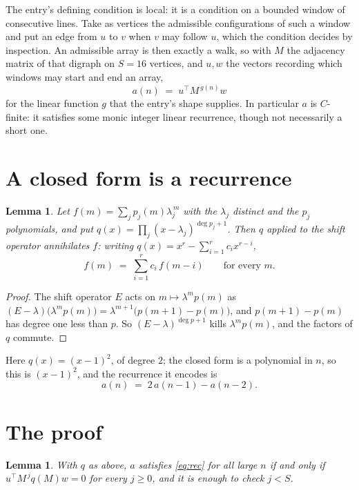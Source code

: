 \documentclass[11pt,a4paper]{article}
\theoremstyle{plain}
\newtheorem{lemma}[theorem]{Lemma}
\theoremstyle{definition}
\begin{document}
The entry's defining condition is local: it is a condition on a bounded window of consecutive lines. Take as vertices the
admissible configurations of such a window and put an edge from $u$ to $v$ when $v$ may
follow $u$, which the condition decides by inspection. An admissible array is then exactly a
walk, so with $M$ the adjacency matrix of that digraph on $S=16$ vertices, and $u,w$ the
vectors recording which windows may start and end an array,
\[
a(n)\;=\;u^{\!\top}M^{\,g(n)}w
\]
for the linear function $g$ that the entry's shape supplies. In particular $a$ is
$C$-finite: it satisfies some monic integer linear recurrence, though not necessarily a short
one.

\section{A closed form is a recurrence}

\begin{lemma}\label{lem:ann}
Let $f(m)=\sum_{j}p_j(m)\lambda_j^{\,m}$ with the $\lambda_j$ distinct and the $p_j$
polynomials, and put $q(x)=\prod_j(x-\lambda_j)^{\deg p_j+1}$. Then $q$ applied to the shift
operator annihilates $f$: writing $q(x)=x^{r}-\sum_{i=1}^{r}c_ix^{r-i}$,
\[
f(m)\;=\;\sum_{i=1}^{r}c_i\,f(m-i)\qquad\text{for every }m.
\]
\end{lemma}

\begin{proof}
The shift operator $E$ acts on $m\mapsto\lambda^{m}p(m)$ as
$(E-\lambda)\bigl(\lambda^{m}p(m)\bigr)=\lambda^{m+1}\bigl(p(m+1)-p(m)\bigr)$, and
$p(m+1)-p(m)$ has degree one less than $p$. So $(E-\lambda)^{\deg p+1}$ kills
$\lambda^{m}p(m)$, and the factors of $q$ commute.
\end{proof}

Here $q(x)=(x-1)^{2}$, of degree $2$; the closed form is a polynomial in $n$, so this is $(x-1)^{2}$, and the recurrence it encodes is
\begin{equation}\label{eq:rec}
a(n)\;=\;2\,a(n-1) - a(n-2).
\end{equation}

\section{The proof}

\begin{lemma}\label{lem:crit}
With $q$ as above, $a$ satisfies \eqref{eq:rec} for all large $n$ if and only if
$u^{\!\top}M^{\,j}q(M)w=0$ for every $j\ge0$, and it is enough to check $j<S$.
\end{lemma}
\end{document}
